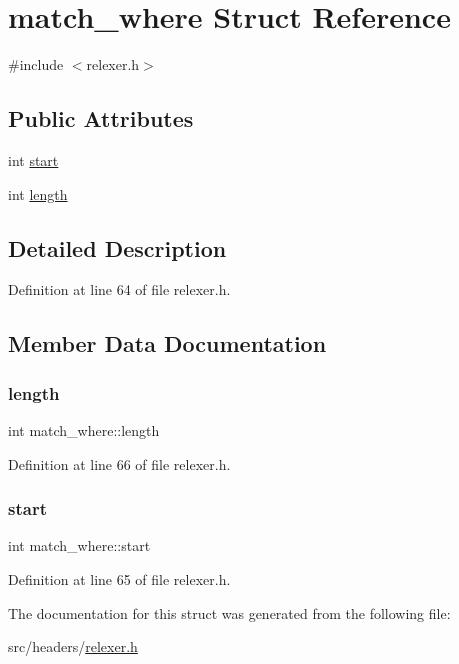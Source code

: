 \hypertarget{structmatch__where}{}\section{match\+\_\+where Struct Reference}
\label{structmatch__where}


{\ttfamily \#include $<$relexer.\+h$>$}

\subsection*{Public Attributes}
\begin{DoxyCompactItemize}
\item 
int \hyperlink{structmatch__where_aa410c136db545a9141e51b2111003e86}{start}
\item 
int \hyperlink{structmatch__where_a605e7bbfb18fda603402012c2d97dd42}{length}
\end{DoxyCompactItemize}


\subsection{Detailed Description}


Definition at line 64 of file relexer.\+h.



\subsection{Member Data Documentation}
\mbox{\label{structmatch__where_a605e7bbfb18fda603402012c2d97dd42}} 
\subsubsection{\texorpdfstring{length}{length}}
{\footnotesize\ttfamily int match\+\_\+where\+::length}



Definition at line 66 of file relexer.\+h.

\mbox{\label{structmatch__where_aa410c136db545a9141e51b2111003e86}} 
\subsubsection{\texorpdfstring{start}{start}}
{\footnotesize\ttfamily int match\+\_\+where\+::start}



Definition at line 65 of file relexer.\+h.



The documentation for this struct was generated from the following file\+:\begin{DoxyCompactItemize}
\item 
src/headers/\hyperlink{relexer_8h}{relexer.\+h}\end{DoxyCompactItemize}
